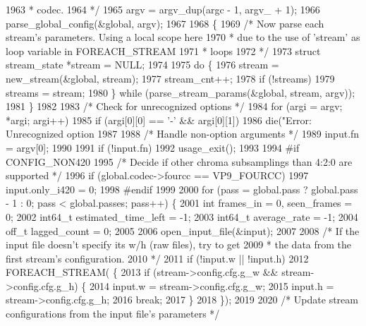 \begin{DoxyCodeInclude}
{{{{{{{{{{{{{{{{{{{{{{{{{{{{{{{{{{{{{{{{{{{{{{{{{{{{{{{{{{{{1963 \textcolor{comment}{   * codec.}
1964 \textcolor{comment}{   */}
1965   argv = argv\_dup(argc - 1, argv\_ + 1);
1966   parse\_global\_config(&global, argv);
1967 
1968   \{
1969     \textcolor{comment}{/* Now parse each stream's parameters. Using a local scope here}
1970 \textcolor{comment}{     * due to the use of 'stream' as loop variable in FOREACH\_STREAM}
1971 \textcolor{comment}{     * loops}
1972 \textcolor{comment}{     */}
1973     \textcolor{keyword}{struct }stream\_state *stream = NULL;
1974 
1975     \textcolor{keywordflow}{do} \{
1976       stream = new\_stream(&global, stream);
1977       stream\_cnt++;
1978       \textcolor{keywordflow}{if} (!streams)
1979         streams = stream;
1980     \} \textcolor{keywordflow}{while} (parse\_stream\_params(&global, stream, argv));
1981   \}
1982 
1983   \textcolor{comment}{/* Check for unrecognized options */}
1984   \textcolor{keywordflow}{for} (argi = argv; *argi; argi++)
1985     \textcolor{keywordflow}{if} (argi[0][0] == \textcolor{charliteral}{'-'} && argi[0][1])
1986       die(\textcolor{stringliteral}{"Error: Unrecognized option %
1987 
1988   \textcolor{comment}{/* Handle non-option arguments */}
1989   input.fn = argv[0];
1990 
1991   \textcolor{keywordflow}{if} (!input.fn)
1992     usage\_exit();
1993 
1994 \textcolor{preprocessor}{#if CONFIG\_NON420}
1995   \textcolor{comment}{/* Decide if other chroma subsamplings than 4:2:0 are supported */}
1996   \textcolor{keywordflow}{if} (global.codec->fourcc == VP9\_FOURCC)
1997     input.only\_i420 = 0;
1998 \textcolor{preprocessor}{#endif}
1999 
2000   \textcolor{keywordflow}{for} (pass = global.pass ? global.pass - 1 : 0; pass < global.passes; pass++) \{
2001     \textcolor{keywordtype}{int} frames\_in = 0, seen\_frames = 0;
2002     int64\_t estimated\_time\_left = -1;
2003     int64\_t average\_rate = -1;
2004     off\_t lagged\_count = 0;
2005 
2006     open\_input\_file(&input);
2007 
2008     \textcolor{comment}{/* If the input file doesn't specify its w/h (raw files), try to get}
2009 \textcolor{comment}{     * the data from the first stream's configuration.}
2010 \textcolor{comment}{     */}
2011     \textcolor{keywordflow}{if} (!input.w || !input.h)
2012       FOREACH\_STREAM( \{
2013       \textcolor{keywordflow}{if} (stream->config.cfg.g\_w && stream->config.cfg.g\_h) \{
2014         input.w = stream->config.cfg.g\_w;
2015         input.h = stream->config.cfg.g\_h;
2016         break;
2017       \}
2018     \});
2019 
2020     \textcolor{comment}{/* Update stream configurations from the input file's parameters */}
}}}}}}}}}}}}}}}}}}}}}}}}}}}}}}}}}}}}}}}}}}}}}}}}}}}}}}}}}}}}}
\end{DoxyCodeInclude}
